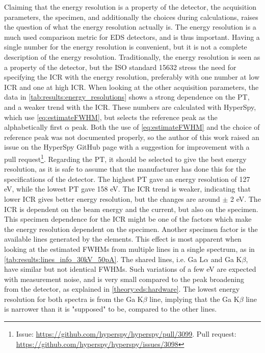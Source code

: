 Claiming that the energy resolution is a property of the detector, the acquisition parameters, the specimen, and additionally the choices during calculations, raises the question of what the energy resolution actually is.
The energy resolution is a much used comparison metric for EDS detectors, and is thus important.
Having a single number for the energy resolution is convenient, but it is not a complete description of the energy resolution.
Traditionally, the energy resolution is seen as a property of the detector, but the ISO standard 15632 \cite{iso_qc_15632} stress the need for specifying the ICR with the energy resolution, preferably with one number at low ICR and one at high ICR.
When looking at the other acquisition parameters, the data in \cref{tab:results:energy_resolutions} shows a strong dependence on the PT, and a weaker trend with the ICR.
These numbers are calculated with HyperSpy, which use \cref{eq:estimateFWHM}, but selects the reference peak as the alphabetically first $\alpha$ peak.
Both the use of \cref{eq:estimateFWHM} and the choice of reference peak was not documented properly, so the author of this work raised an issue on the HyperSpy GitHub page with a suggestion for improvement with a pull request\footnote{Issue: \url{https://github.com/hyperspy/hyperspy/pull/3099}. Pull request: \url{https://github.com/hyperspy/hyperspy/issues/3098}}.
Regarding the PT, it should be selected to give the best energy resolution, as it is safe to assume that the manufacturer has done this for the specifications of the detector. 
The highest PT gave an energy resolution of 127 eV, while the lowest PT gave 158 eV.
The ICR trend is weaker, indicating that lower ICR gives better energy resolution, but the changes are around $\pm$ 2 eV.
The ICR is dependent on the beam energy and the current, but also on the specimen.
This specimen dependence for the ICR might be one of the factors which make the energy resolution dependent on the specimen.
Another specimen factor is the available lines generated by the elements.
This effect is most apparent when looking at the estimated FWHMs from multiple lines in a single spectrum, as in \cref{tab:results:lines_info_30kV_50pA}.
The shared lines, i.e. Ga L$\alpha$ and Ga K$\beta$, have similar but not identical FWHMs.
Such variations of a few eV are expected with measurement noise, and is very small compared to the peak broadening from the detector, as explained in \cref{theory:eds:hardware}.
The lowest energy resolution for both spectra is from the Ga K$\beta$ line, implying that the Ga K$\beta$ line is narrower than it is "supposed" to be, compared to the other lines.

